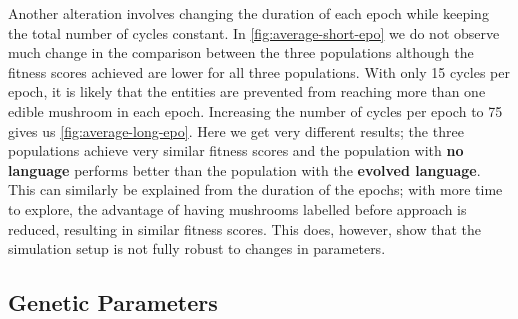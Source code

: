 \documentclass[12pt,a4paper]{report}
\begin{document}
Another alteration involves changing the duration of each epoch while keeping the total number of cycles constant. In \cref{fig:average-short-epo} we do not observe much change in the comparison between the three populations although the fitness scores achieved are lower for all three populations. With only 15 cycles per epoch, it is likely that the entities are prevented from reaching more than one edible mushroom in each epoch. Increasing the number of cycles per epoch to 75 gives us \cref{fig:average-long-epo}. Here we get very different results; the three populations achieve very similar fitness scores and the population with {\bf no language} performs better than the population with the {\bf evolved language}. This can similarly be explained from the duration of the epochs; with more time to explore, the advantage of having mushrooms labelled before approach is reduced, resulting in similar fitness scores. This does, however, show that the simulation setup is not fully robust to changes in parameters.
 
 \subsection{Genetic Parameters}
 
\end{document}
